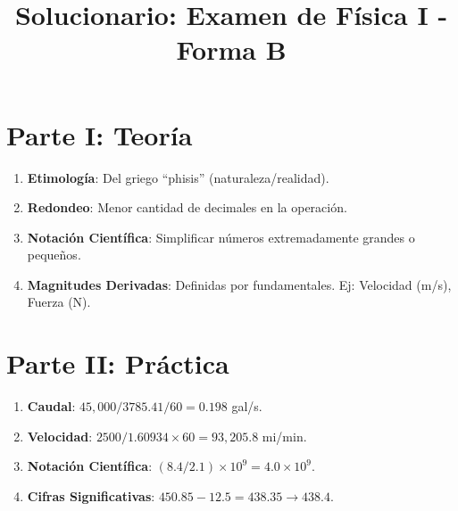 \documentclass[a4paper,12pt]{article}
\title{Solucionario: Examen de Física I - Forma B}
\date{}
\begin{document}
\maketitle

\section{Parte I: Teoría}
\begin{enumerate}
    \item \textbf{Etimología}: Del griego ``phisis'' (naturaleza/realidad).
    \item \textbf{Redondeo}: Menor cantidad de decimales en la operación.
    \item \textbf{Notación Científica}: Simplificar números extremadamente grandes o pequeños.
    \item \textbf{Magnitudes Derivadas}: Definidas por fundamentales. Ej: Velocidad (m/s), Fuerza (N).
\end{enumerate}

\section{Parte II: Práctica}
\begin{enumerate}
    \item \textbf{Caudal}: $45,000 / 3785.41 / 60 = 0.198$ gal/s.
    \item \textbf{Velocidad}: $2500 / 1.60934 \times 60 = 93,205.8$ mi/min.
    \item \textbf{Notación Científica}: $(8.4 / 2.1) \times 10^9 = 4.0 \times 10^9$.
    \item \textbf{Cifras Significativas}: $450.85 - 12.5 = 438.35 \rightarrow 438.4$.
\end{enumerate}
\end{document}
